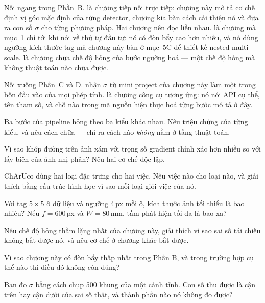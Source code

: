 \documentclass[../../marker.tex]{subfiles}
\begin{document}
Nối ngang trong Phần~B.  là chương tiếp nối trực tiếp: chương này mô tả cơ chế định vị góc mặc định của từng detector, chương kia bàn cách cải thiện nó và đưa ra con số \(\sigma\) cho từng phương pháp. Hai chương nên đọc liền nhau.  là chương mà mục~1 chỉ tới khi nói về thứ tự đầu tư: nó có đòn bẩy cao hơn nhiều, và nó dùng ngưỡng kích thước tag mà chương này bàn ở mục~5C để thiết kế nested multi-scale.  là chương chữa chế độ hỏng của bước ngưỡng hoá --- một chế độ hỏng mà không thuật toán nào chữa được.

Nối xuống Phần~C và D.  nhận \(\sigma\) từ mini project của chương này làm một trong bốn đầu vào của mọi phép tính.  là chương công cụ tương ứng: nó nói API cụ thể, tên tham số, và chỗ nào trong mã nguồn hiện thực hoá từng bước mô tả ở đây.

\begin{tukiem}
\item Ba bước của pipeline hỏng theo ba kiểu khác nhau. Nêu triệu chứng của từng kiểu, và nêu cách chữa --- chỉ ra cách nào \emph{không} nằm ở tầng thuật toán.
\item Vì sao khớp đường trên ảnh xám với trọng số gradient chính xác hơn nhiều so với lấy biên của ảnh nhị phân? Nêu hai cơ chế độc lập.
\item ChArUco dùng hai loại đặc trưng cho hai việc. Nêu việc nào cho loại nào, và giải thích bằng cấu trúc hình học vì sao mỗi loại giỏi việc của nó.
\item Với tag \(5\times5\) ô dữ liệu và ngưỡng 4\,px mỗi ô, kích thước ảnh tối thiểu là bao nhiêu? Nếu \(f = 600\)\,px và \(W = 80\)\,mm, tầm phát hiện tối đa là bao xa?
\item Nêu chế độ hỏng thầm lặng nhất của chương này, giải thích vì sao sai số tái chiếu không bắt được nó, và nêu cơ chế ở chương khác bắt được.
\item Vì sao chương này có đòn bẩy thấp nhất trong Phần B, và trong trường hợp cụ thể nào thì điều đó không còn đúng?
\item Bạn đo \(\sigma\) bằng cách chụp 500 khung của một cảnh tĩnh. Con số thu được là cận trên hay cận dưới của sai số thật, và thành phần nào nó không đo được?
\end{tukiem}
\ifSubfilesClassLoaded{\printbibliography[title={Nguồn}]}{}
\end{document}
